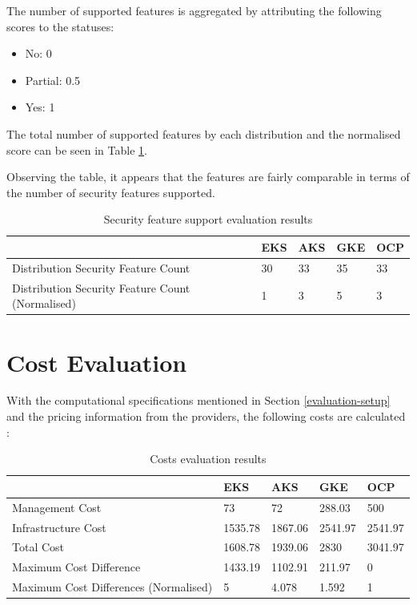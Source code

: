 The number of supported features is aggregated by attributing the following scores to the statuses:


\begin{itemize}
\tightlist
\item
  No: 0
\item
  Partial: 0.5
\item
  Yes: 1
\end{itemize}



The total number of supported features by each distribution and the normalised score can be seen in Table \ref{tab:security-evaluation}.

Observing the table, it appears that the features are fairly comparable in terms of the number of security features supported.

\begin{table}[!ht]
    \centering
    \begin{tabular}{|p{4cm}|p{2cm}|p{2cm}|p{2cm}|p{2cm}|} %
    \hline
         & EKS & AKS & GKE & OCP \\ \hline
        Distribution Security Feature Count& 30& 33& 35& 33\\ \hline
 Distribution Security Feature Count (Normalised)& 1& 3& 5&3\\\hline
    \end{tabular}
    \caption{Security feature support evaluation results} 
    \label{tab:security-evaluation}
\end{table}

\section{Cost Evaluation}

With the computational specifications mentioned in Section \ref{evaluation-setup} and the pricing information from the providers, the following costs are calculated \cite{CreateEstimateConfigure,PricingAzureKubernetes,GoogleCloudPricing,RedHatOpenShiftd}:
\begin{table}[!ht]
    \centering
    \begin{tabular}{|p{4cm}|p{2cm}|p{2cm}|p{2cm}|p{2cm}|} %
    \hline
         & EKS & AKS & GKE & OCP \\ \hline
        Management Cost & 73 & 72 & 288.03 & 500 \\ \hline
        Infrastructure Cost & 1535.78 & 1867.06 & 2541.97 & 2541.97 \\ \hline
        Total Cost & 1608.78 & 1939.06 & 2830 & 3041.97 \\ \hline
        Maximum Cost Difference & 1433.19 & 1102.91 & 211.97 & 0 \\ \hline
        Maximum Cost Differences (Normalised) & 5 & 4.078 & 1.592 & 1 \\ \hline
    \end{tabular}
    \caption{Costs evaluation results} 
    \label{tab:cost-analysis}
\end{table}


